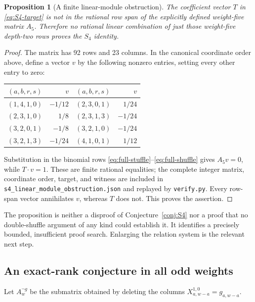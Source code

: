 \documentclass[11pt,a4paper]{article}
\numberwithin{equation}{section}
\newtheorem{proposition}[theorem]{Proposition}
\theoremstyle{definition}
\theoremstyle{remark}
\begin{document}
\begin{proposition}[A finite linear-module obstruction]\label{prop:S4-obstruction}
The coefficient vector $T$ in \eqref{eq:S4-target} is not in the rational row span of the explicitly defined weight-five matrix $A_5$. Therefore no rational linear combination of just those weight-five depth-two rows proves the $S_4$ identity.
\end{proposition}
\begin{proof}
The matrix has 92 rows and 23 columns. In the canonical coordinate order above, define a vector $v$ by the following nonzero entries, setting every other entry to zero:
\begin{center}
\begin{tabular}{@{}crcr@{}}
\toprule
$(a,b,r,s)$ & $v$ & $(a,b,r,s)$ & $v$\\
\midrule
$(1,4,1,0)$&$-1/12$ & $(2,3,0,1)$&$1/24$\\
$(2,3,1,0)$&$1/8$   & $(2,3,1,3)$&$-1/24$\\
$(3,2,0,1)$&$-1/8$  & $(3,2,1,0)$&$-1/24$\\
$(3,2,1,3)$&$-1/24$ & $(4,1,0,1)$&$1/12$\\
\bottomrule
\end{tabular}
\end{center}
Substitution in the binomial rows \eqref{eq:full-stuffle}--\eqref{eq:full-shuffle} gives $A_5v=0$, while $T\cdot v=1$. These are finite rational equalities; the complete integer matrix, coordinate order, target, and witness are included in
\texttt{s4\_linear\_module\_obstruction.json} and replayed by \texttt{verify.py}. Every row-span vector annihilates $v$, whereas $T$ does not. This proves the assertion.
\end{proof}
The proposition is neither a disproof of Conjecture~\ref{conj:S4} nor a proof that no double-shuffle argument of any kind could establish it. It identifies a precisely bounded, insufficient proof search. Enlarging the relation system is the relevant next step.

\subsection{An exact-rank conjecture in all odd weights}
Let $A_w^{\neg g}$ be the submatrix obtained by deleting the columns
$X_{a,w-a}^{1,0}=g_{a,w-a}$.
\end{document}
